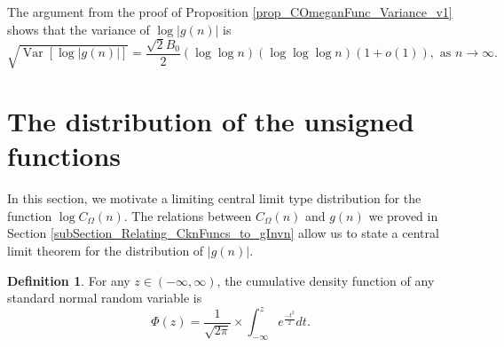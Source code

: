 \documentclass[11pt,reqno,a4letter]{article}
\newcommand{\hlocalref}[1]{\hyperref[#1]{\ref{#1}}}
\numberwithin{equation}{section}
\numberwithin{figure}{section}
\numberwithin{table}{section}
\theoremstyle{plain}
\numberwithin{theorem}{section}
\theoremstyle{definition}
\newtheorem{definition}[theorem]{Definition}
\begin{document}
The argument from the proof of 
Proposition \hlocalref{prop_COmeganFunc_Variance_v1} 
shows that the variance of $\log |g(n)|$ is 
\[
\sqrt{\operatorname{Var}\left[\log |g(n)|\right]}= 
     \frac{\sqrt{2} B_0}{2} (\log\log n) (\log\log\log n) (1+o(1)), 
     \text{ as } n \rightarrow \infty. 
\]

\section{The distribution of the unsigned functions} 
\label{subSection_ErdosKacTheorem_Analogs} 

In this section, we motivate a limiting 
central limit type distribution for the function $\log C_{\Omega}(n)$. 
The relations between $C_{\Omega}(n)$ and $g(n)$ we proved in 
Section \hlocalref{subSection_Relating_CknFuncs_to_gInvn} 
allow us to state a central limit theorem for the distribution of $|g(n)|$. 

\begin{definition}
For any $z \in (-\infty, \infty)$, 
the cumulative density function of any standard normal random variable is 
$$\Phi(z) = \frac{1}{\sqrt{2\pi}} \times \int_{-\infty}^{z} e^{\frac{-t^2}{2}} dt.$$ 
\end{definition}
\end{document}
